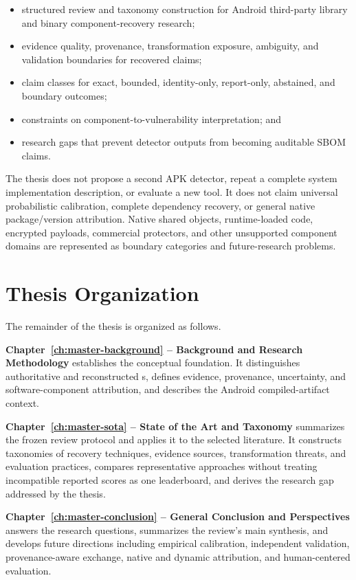 \begin{itemize}
  \item structured review and taxonomy construction for Android third-party
  library and binary component-recovery research;
  \item evidence quality, provenance, transformation exposure, ambiguity, and
  validation boundaries for recovered claims;
  \item claim classes for exact, bounded, identity-only, report-only,
  abstained, and boundary outcomes;
  \item constraints on component-to-vulnerability interpretation; and
  \item research gaps that prevent detector outputs from becoming auditable
  SBOM claims.
\end{itemize}

The thesis does not propose a second APK detector, repeat a complete system
implementation description, or evaluate a new tool. It does not claim
universal probabilistic calibration, complete dependency recovery, or general
native package/version attribution. Native shared objects, runtime-loaded
code, encrypted payloads, commercial protectors, and other unsupported
component domains are represented as boundary categories and future-research
problems.

\section{Thesis Organization}

The remainder of the thesis is organized as follows.

\textbf{Chapter~\ref{ch:master-background} -- Background and Research
Methodology} establishes the conceptual foundation. It distinguishes
authoritative and reconstructed \SBOM{}s, defines evidence, provenance,
uncertainty, and software-component attribution, and describes the Android
compiled-artifact context.

\textbf{Chapter~\ref{ch:master-sota} -- State of the Art and Taxonomy}
summarizes the frozen review protocol and applies it to the selected
literature. It constructs taxonomies of recovery techniques, evidence
sources, transformation threats, and evaluation practices, compares
representative approaches without treating incompatible reported scores as
one leaderboard, and derives the research gap addressed by the thesis.

\textbf{Chapter~\ref{ch:master-conclusion} -- General Conclusion and
Perspectives} answers the research questions, summarizes the review's main
synthesis, and develops future directions including
empirical calibration, independent validation, provenance-aware exchange,
native and dynamic attribution, and human-centered evaluation.
